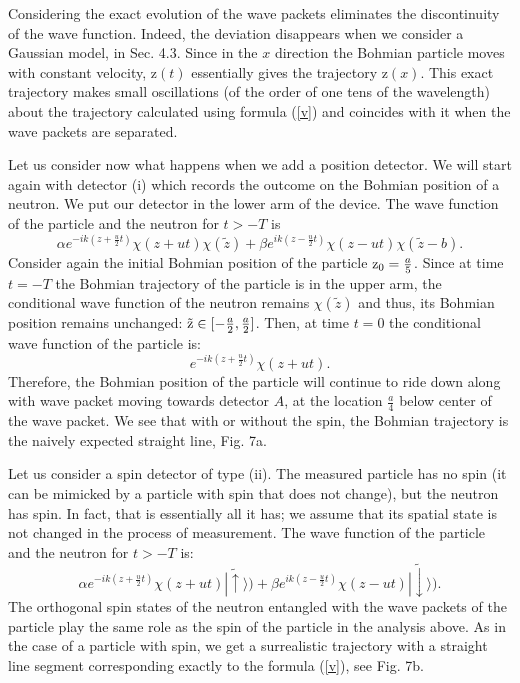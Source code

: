 \documentclass[12pt,preprint,tightenlines]{elsarticle}
\begin{document}
 Considering the exact evolution of the wave packets
eliminates the discontinuity of the wave function. Indeed, the deviation disappears
when we consider a Gaussian model, in Sec. 4.3.
 Since in the $x$ direction the Bohmian particle moves with constant
velocity, $\mathrm{z}(t)$ essentially gives the trajectory $\mathrm{z}(x)$.
This exact trajectory makes small oscillations (of the order of one tens of the wavelength) about the trajectory
calculated using formula (\ref{v}) and coincides with it when the
wave packets are separated.

Let us consider now what happens when we add a position detector.
We will start again with detector (i) which records the outcome on
the Bohmian position of a neutron.
We put our detector in the lower arm of the device. The wave
function of the particle and the neutron for $t>-T$ is
 \begin{equation}
\alpha e^{-ik(z+\frac{u}{2}t)}\chi(z+ut)\chi(\tilde{z})+\beta e^{ik(z-\frac{u}{2}t)}\chi(z-ut)\chi(\tilde{z}-b).\label{psioutnospin2}
\end{equation}
 Consider again the initial Bohmian position of the particle ${\rm z_{0}}=\frac{a}{5}$.
Since at time $t=-T$ the Bohmian trajectory of the particle  is in the upper arm, the conditional wave function of the neutron
remains $\chi(\tilde{z})$ and thus, its Bohmian position remains
unchanged: ${\rm \tilde{z}}\in[-\frac{a}{2},\frac{a}{2}]$. Then,
at time $t=0$ the conditional wave function of the particle is:
 \begin{equation}
e^{-ik(z+\frac{u}{2}t)}\chi(z+ut).\label{psiout5}
\end{equation}
 Therefore, the Bohmian position of the particle will continue to
ride down along with wave packet moving towards detector $A$, at the location $\frac{a}{4}$
below center of the wave packet. We see that with or without
the spin, the Bohmian trajectory is the naively expected straight line, Fig. 7a.

Let us consider a spin detector of type (ii). The measured particle
has no spin (it can be mimicked by a particle with spin that does not
change), but the neutron has spin. In fact, that is essentially all it has; we
assume that its spatial state is not changed in the process of measurement.
The wave function of the particle and the neutron for $t>-T$ is:
\begin{equation}
\alpha e^{-ik(z+\frac{u}{2}t)}\chi(z+ut)|\tilde{\uparrow}\rangle)+\beta e^{ik(z-\frac{u}{2}t)}\chi(z-ut)|\tilde{\downarrow}\rangle).\label{psioutnox33ns}\end{equation}
 The orthogonal spin states of the neutron entangled with the wave
packets of the particle play the same role as the spin of the particle
in the analysis above. As in the case of a particle with  spin, we get a surrealistic trajectory with a straight
line segment corresponding exactly to the formula (\ref{v}), see Fig. 7b.
\end{document}
